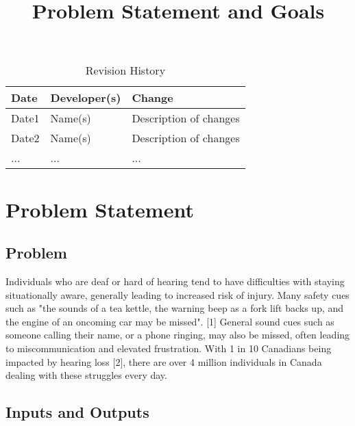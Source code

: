 \documentclass{article}
\title{Problem Statement and Goals\\\progname}
\author{\authname}
\date{}
\begin{document}
\maketitle

\begin{table}[hp]
\caption{Revision History} \label{TblRevisionHistory}
\begin{tabularx}{\textwidth}{llX}
\toprule
\textbf{Date} & \textbf{Developer(s)} & \textbf{Change}\\
\midrule
Date1 & Name(s) & Description of changes\\
Date2 & Name(s) & Description of changes\\
... & ... & ...\\
\bottomrule
\end{tabularx}
\end{table}

\section{Problem Statement}



\subsection{Problem}

Individuals who are deaf or hard of hearing tend to have difficulties with staying situationally aware, generally leading to increased risk of injury.
Many safety cues such as "the sounds of a tea kettle, the warning beep as a fork lift backs up, and the engine of an oncoming car may be missed". [1]
General sound cues such as someone calling their name, or a phone ringing, may also be missed, often leading to miscommunication and elevated frustration.
With 1 in 10 Canadians being impacted by hearing loss [2], there are over 4 million individuals in Canada dealing with these struggles every day.


\subsection{Inputs and Outputs}

\end{document}
